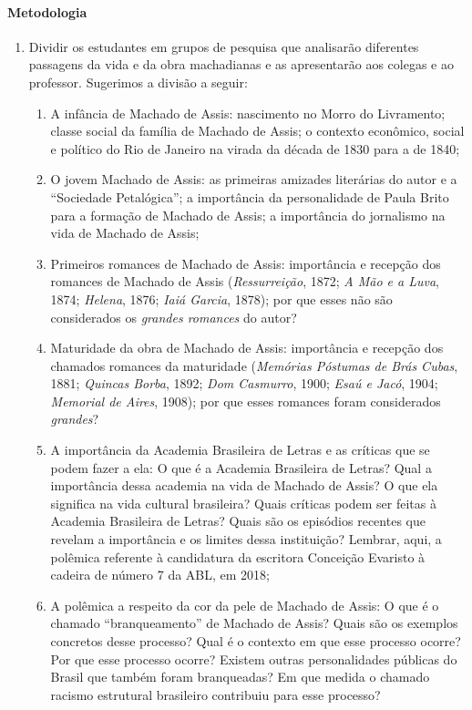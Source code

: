 \documentclass[12pt]{extarticle}
\begin{document}
\paragraph{Metodologia}
\begin{enumerate}
\item
Dividir os estudantes em grupos de pesquisa que analisarão diferentes
passagens da vida e da obra machadianas e as apresentarão aos colegas e
ao professor. Sugerimos a divisão a seguir:

\begin{enumerate}
\item A infância de Machado de Assis: nascimento no Morro do Livramento;
classe social da família de Machado de Assis; o contexto econômico,
social e político do Rio de Janeiro na virada da década de 1830 para a
de 1840;

\item O jovem Machado de Assis: as primeiras amizades literárias do autor e
a ``Sociedade Petalógica''; a importância da personalidade de Paula
Brito para a formação de Machado de Assis; a importância do jornalismo
na vida de Machado de Assis;

\item Primeiros romances de Machado de Assis: importância e recepção dos
romances de Machado de Assis (\emph{Ressurreição}, 1872; \emph{A Mão e a
Luva}, 1874; \emph{Helena}, 1876; \emph{Iaiá Garcia}, 1878); por que
esses não são considerados os \emph{grandes romances} do autor?

\item Maturidade da obra de Machado de Assis: importância e recepção dos
chamados romances da maturidade (\emph{Memórias Póstumas de Brás Cubas},
1881; \emph{Quincas Borba}, 1892; \emph{Dom Casmurro}, 1900; \emph{Esaú
e Jacó}, 1904; \emph{Memorial de Aires}, 1908); por que esses romances
foram considerados \emph{grandes}?

\item A importância da Academia Brasileira de Letras e as críticas que se
podem fazer a ela: O que é a Academia Brasileira de Letras? Qual a
importância dessa academia na vida de Machado de Assis? O que ela
significa na vida cultural brasileira? Quais críticas podem ser feitas à
Academia Brasileira de Letras? Quais são os episódios recentes que
revelam a importância e os limites dessa instituição? Lembrar, aqui, a
polêmica referente à candidatura da escritora Conceição Evaristo à
cadeira de número 7 da ABL, em 2018;

\item A polêmica a respeito da cor da pele de Machado de Assis: O que é o
chamado ``branqueamento'' de Machado de Assis? Quais são os exemplos
concretos desse processo? Qual é o contexto em que esse processo ocorre?
Por que esse processo ocorre? Existem outras personalidades públicas do
Brasil que também foram branqueadas? Em que medida o chamado racismo
estrutural brasileiro contribuiu para esse processo?


\end{enumerate}
\end{enumerate}
\end{document}
